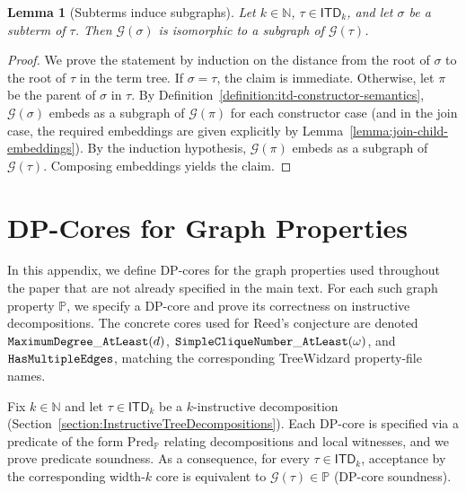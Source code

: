 \documentclass[11pt,a4paper]{article}
\newtheorem{lemma}[theorem]{Lemma}
\newcommand{\treewidthvalue}{k}
\newcommand{\decompositiongraph}[1]{\mathcal{G}(#1)}
\newcommand{\N}{\mathbb{N}}
\newcommand{\allabstractdecompositionstreewidth}[1]{\mathsf{ITD}_{#1}}
\newcommand{\abstractdecomposition}{\tau}
\newcommand{\sigmaabstractdecomposition}{\sigma}
\newcommand{\graphproperty}{\mathbb{P}}
\newcommand{\dpNamePart}[1]{\mbox{\normalfont\ttfamily #1}}
\newcommand{\hasMultiEdgeCore}{\dpNamePart{HasMultipleEdges}}
\newcommand{\simpleCliqueNumberAtLeastCore}[1]{\dpNamePart{SimpleCliqueNumber}\_\allowbreak\dpNamePart{AtLeast}(#1)}
\newcommand{\maxDegreeAtLeastCore}[1]{\dpNamePart{MaximumDegree}\_\allowbreak\dpNamePart{AtLeast}(#1)}
\newcommand{\cliqueparameter}{\omega}
\newcommand{\maxdegreeparameter}{d}
\begin{document}
\begin{lemma}[Subterms induce subgraphs]
\label{lemma:subterm-subgraph}
Let $\treewidthvalue\in \N$, $\abstractdecomposition\in \allabstractdecompositionstreewidth{\treewidthvalue}$, and let $\sigmaabstractdecomposition$ be a subterm of $\abstractdecomposition$. Then $\decompositiongraph{\sigmaabstractdecomposition}$ is isomorphic to a subgraph of $\decompositiongraph{\abstractdecomposition}$.
\end{lemma}
\begin{proof}
We prove the statement by induction on the distance from the root of $\sigmaabstractdecomposition$ to the root of $\abstractdecomposition$ in the term tree. If $\sigmaabstractdecomposition=\abstractdecomposition$, the claim is immediate. Otherwise, let $\pi$ be the parent of $\sigmaabstractdecomposition$ in $\abstractdecomposition$. By Definition~\ref{definition:itd-constructor-semantics}, $\decompositiongraph{\sigmaabstractdecomposition}$ embeds as a subgraph of $\decompositiongraph{\pi}$ for each constructor case (and in the join case, the required embeddings are given explicitly by Lemma~\ref{lemma:join-child-embeddings}). By the induction hypothesis, $\decompositiongraph{\pi}$ embeds as a subgraph of $\decompositiongraph{\abstractdecomposition}$. Composing embeddings yields the claim.
\end{proof}

\section{DP-Cores for Graph Properties}
\label{appendix:DPCores}

In this appendix, we define DP-cores for the graph properties used throughout the paper that are not already specified in the main text.
For each such graph property $\graphproperty$, we specify a DP-core and prove its correctness on instructive decompositions.
The concrete cores used for Reed's conjecture are denoted
$\maxDegreeAtLeastCore{\maxdegreeparameter}$,
$\simpleCliqueNumberAtLeastCore{\cliqueparameter}$, and
$\hasMultiEdgeCore$, matching the corresponding TreeWidzard property-file names.

Fix $k\in \N$ and let $\abstractdecomposition\in \allabstractdecompositionstreewidth{k}$ be a $k$-instructive decomposition (Section~\ref{section:InstructiveTreeDecompositions}).
Each DP-core is specified via a predicate of the form $\mathrm{Pred}_{\graphproperty}$ relating decompositions and local witnesses, and we prove predicate soundness.
As a consequence, for every $\abstractdecomposition\in \allabstractdecompositionstreewidth{k}$, acceptance by the corresponding width-$k$ core is equivalent to $\decompositiongraph{\abstractdecomposition}\in \graphproperty$ (DP-core soundness).
\end{document}
